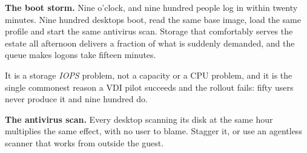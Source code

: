 \begin{alertbox}
\textbf{The boot storm.} Nine o'clock, and nine hundred people log in within
twenty minutes. Nine hundred desktops boot, read the same base image, load the
same profile and start the same antivirus scan. Storage that comfortably serves
the estate all afternoon delivers a fraction of what is suddenly demanded, and
the queue makes logons take fifteen minutes.

\smallskip
It is a storage \emph{IOPS} problem, not a capacity or a CPU problem, and it is
the single commonest reason a VDI pilot succeeds and the rollout fails: fifty
users never produce it and nine hundred do.

\smallskip
\textbf{The antivirus scan.} Every desktop scanning its disk at the same hour
multiplies the same effect, with no user to blame. Stagger it, or use an
agentless scanner that works from outside the guest.
\end{alertbox}


